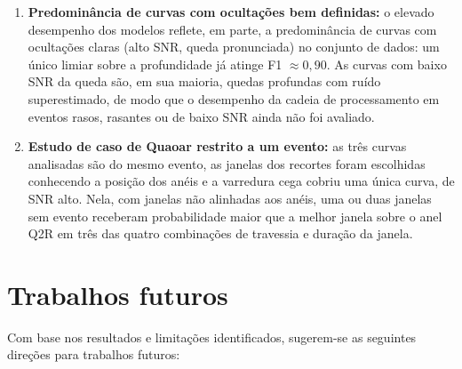 \begin{enumerate}
	\item \textbf{Predominância de curvas com ocultações bem definidas:} o elevado desempenho dos modelos reflete, em parte, a predominância de curvas com ocultações claras (alto SNR, queda pronunciada) no conjunto de dados: um único limiar sobre a profundidade já atinge F1 $\approx 0{,}90$. As curvas com baixo SNR da queda são, em sua maioria, quedas profundas com ruído superestimado, de modo que o desempenho da cadeia de processamento em eventos rasos, rasantes ou de baixo SNR ainda não foi avaliado.

	\item \textbf{Estudo de caso de Quaoar restrito a um evento:} as três curvas analisadas são do mesmo evento, as janelas dos recortes foram escolhidas conhecendo a posição dos anéis e a varredura cega cobriu uma única curva, de SNR alto. Nela, com janelas não alinhadas aos anéis, uma ou duas janelas sem evento receberam probabilidade maior que a melhor janela sobre o anel Q2R em três das quatro combinações de travessia e duração da janela.
\end{enumerate}

\section{Trabalhos futuros}

Com base nos resultados e limitações identificados, sugerem-se as seguintes direções para trabalhos futuros:


